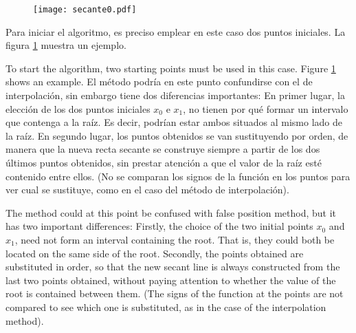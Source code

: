 \begin{figure}[h]
\texttt{[image: secante0.pdf]}
\label{fig:secante}
\end{figure}

\begin{paracol}{2}
Para iniciar el algoritmo, es preciso emplear en este caso dos puntos iniciales. La figura \ref{fig:secante} muestra un ejemplo.

    \switchcolumn
    To start the algorithm, two starting points must be used in this case. Figure \ref{fig:secante} shows an example.
\switchcolumn
El método podría en este punto confundirse con el de interpolación, sin embargo tiene dos diferencias importantes: En primer lugar, la elección de los dos puntos iniciales $x_0$ e $x_1$, no tienen por qué formar un intervalo que contenga a la raíz. Es decir, podrían estar ambos situados al mismo lado de la raíz. En segundo lugar, los puntos obtenidos se van sustituyendo por orden, de manera que la nueva recta secante se construye siempre a partir de los dos últimos puntos obtenidos, sin prestar atención a que el valor de la raíz esté contenido entre ellos. (No se comparan los signos de la función en los puntos para ver cual se sustituye, como en el caso del método de interpolación). 

\switchcolumn
The method could at this point be confused with false position method, but it has two important differences: Firstly, the choice of the two initial points $x_0$ and $x_1$, need not form an interval containing the root. That is, they could both be located on the same side of the root. Secondly, the points obtained are substituted in order, so that the new secant line is always constructed from the last two points obtained, without paying attention to whether the value of the root is contained between them. (The signs of the function at the points are not compared to see which one is substituted, as in the case of the interpolation method). 

\end{paracol}

